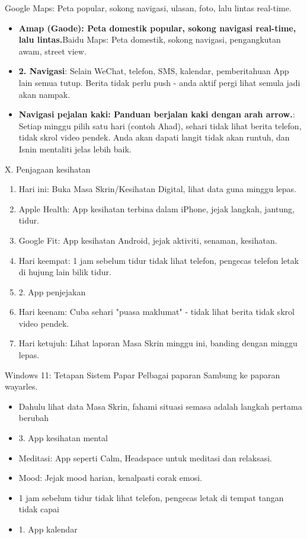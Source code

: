 
Google Maps: Peta popular, sokong navigasi, ulasan, foto, lalu lintas real-time.

\begin{itemize}
  \item \textbf{Amap (Gaode): Peta domestik popular, sokong navigasi real-time, lalu lintas.}Baidu Maps: Peta domestik, sokong navigasi, pengangkutan awam, street view.
  \item \textbf{2. Navigasi}: Selain WeChat, telefon, SMS, kalendar, pemberitahuan App lain semua tutup. Berita tidak perlu push - anda aktif pergi lihat semula jadi akan nampak.
  \item \textbf{Navigasi pejalan kaki: Panduan berjalan kaki dengan arah arrow.}: Setiap minggu pilih satu hari (contoh Ahad), sehari tidak lihat berita telefon, tidak skrol video pendek. Anda akan dapati langit tidak akan runtuh, dan Isnin mentaliti jelas lebih baik.
\end{itemize}

\begin{tcbpractice}{X. Penjagaan kesihatan}
\begin{enumerate}
  \item Hari ini: Buka Masa Skrin/Kesihatan Digital, lihat data guna minggu lepas.
  \item Apple Health: App kesihatan terbina dalam iPhone, jejak langkah, jantung, tidur.
  \item Google Fit: App kesihatan Android, jejak aktiviti, senaman, kesihatan.
  \item Hari keempat: 1 jam sebelum tidur tidak lihat telefon, pengecas telefon letak di hujung lain bilik tidur.
  \item 2. App penjejakan
  \item Hari keenam: Cuba sehari "puasa maklumat" - tidak lihat berita tidak skrol video pendek.
  \item Hari ketujuh: Lihat laporan Masa Skrin minggu ini, banding dengan minggu lepas.
\end{enumerate}

\end{tcbpractice}

\begin{tcbsummary}{Windows 11: Tetapan Sistem Papar Pelbagai paparan Sambung ke paparan wayarles.}
\begin{itemize}
  \item Dahulu lihat data Masa Skrin, fahami situasi semasa adalah langkah pertama berubah
  \item 3. App kesihatan mental
  \item Meditasi: App seperti Calm, Headspace untuk meditasi dan relaksasi.
  \item Mood: Jejak mood harian, kenalpasti corak emosi.
  \item 1 jam sebelum tidur tidak lihat telefon, pengecas letak di tempat tangan tidak capai
  \item 1. App kalendar
\end{itemize}

\end{tcbsummary}
